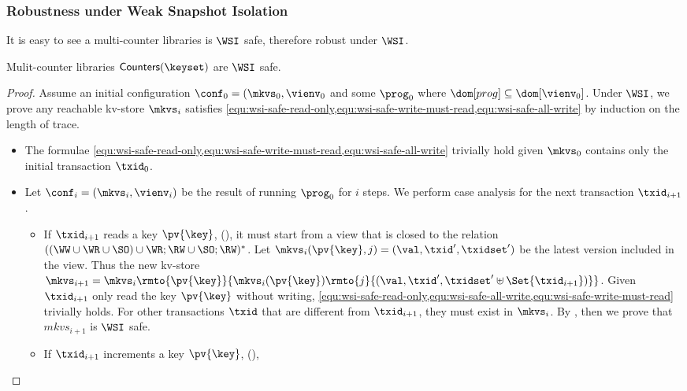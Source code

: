 \subsubsection{Robustness under Weak Snapshot Isolation}
It is easy to see a multi-counter libraries is \( \WSI \) safe, therefore robust under \( \WSI \).
\begin{theorem}
    Mulit-counter libraries \( \mathsf{Counters(\keyset)}  \) are \( \WSI \) safe.
\end{theorem}
\begin{proof}
    Assume an initial configuration \( \conf_0 = (\mkvs_0, \vienv_0 \) 
    and some \( \prog_0 \) where \( \dom[prog] \subseteq \dom[\vienv_0] \).
    Under \( \WSI \), we prove any reachable kv-store \( \mkvs_i \) satisfies \cref{equ:wsi-safe-read-only,equ:wsi-safe-write-must-read,equ:wsi-safe-all-write} by induction on the length of trace.
    \begin{itemize}
        \item {} 
            The formulae \cref{equ:wsi-safe-read-only,equ:wsi-safe-write-must-read,equ:wsi-safe-all-write} trivially hold given \( \mkvs_0 \) contains only the initial transaction \( \txid_0 \).
        \item {}
            Let \( \conf_i = (\mkvs_i, \vienv_i)\) be the result of running \( \prog_0 \) for \( i \) steps.
            We perform case analysis for the next transaction \( \txid_{i+1} \).
            \begin{itemize}
                \item If \( \txid_{i+1}\) reads a key \( \pv{\key} \), \ie \ctrread(\pv{\key}),
                    it must start from a view that is closed to the relation \( (  (\WW \cup \WR \cup \SO) \cup \WR;\RW \cup \SO;\RW )^* \).
                    Let \( \mkvs_i(\pv{\key},j) = (\val, \txid', \txidset') \) be the latest version included in the view.
                    Thus the new kv-store \( \mkvs_{i+1} = \mkvs_{i}\rmto{\pv{\key}}{\mkvs_i(\pv{\key})\rmto{j}{(\val, \txid', \txidset' \uplus \Set{\txid_{i+1}})}} \).
                    Given \( \txid_{i+1} \) only read the key \( \pv{\key} \) without writing, \cref{equ:wsi-safe-read-only,equ:wsi-safe-all-write,equ:wsi-safe-write-must-read} trivially holds.
                    For other transactions \( \txid \) that are different from \( \txid_{i+1} \), they must exist in \( \mkvs_i \).
                    By \ih, then we prove that \( mkvs_{i+1} \) is \( \WSI \) safe.
                \item If \( \txid_{i+1}\) increments a key \( \pv{\key} \), \ie \ctrinc(\pv{\key}),

\end{itemize}
\end{itemize}
\end{proof}
